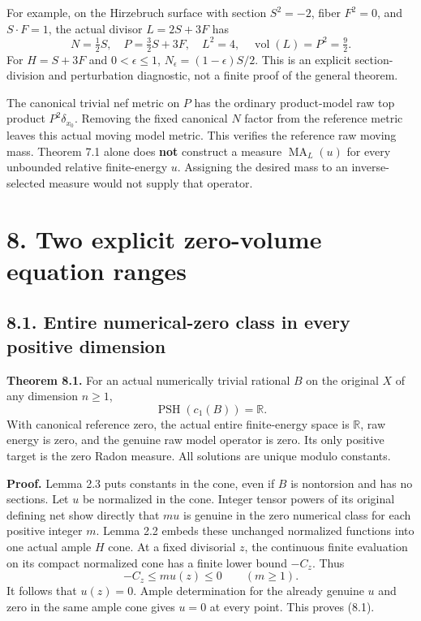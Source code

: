 \documentclass[
  10pt,
]{article}
\begin{document}
For example, on the Hirzebruch surface with section \(S^2=-2\), fiber
\(F^2=0\), and \(S\cdot F=1\), the actual divisor \(L=2S+3F\) has \[
 N=\tfrac12S,\quad P=\tfrac32S+3F,\quad L^2=4,
                     \quad\operatorname{vol}(L)=P^2=\tfrac92.
\] For \(H=S+3F\) and \(0<\epsilon\leq1\),
\(N_\epsilon=(1-\epsilon)S/2\). This is an explicit section-division and
perturbation diagnostic, not a finite proof of the general theorem.

The canonical trivial nef metric on \(P\) has the ordinary product-model
raw top product \(P^2\delta_{x_0}\). Removing the fixed canonical \(N\)
factor from the reference metric leaves this actual moving model metric.
This verifies the reference raw moving mass. Theorem 7.1 alone does
\textbf{not} construct a measure \(\operatorname{MA}_L(u)\) for every
unbounded relative finite-energy \(u\). Assigning the desired mass to an
inverse-selected measure would not supply that operator.

\section{8. Two explicit zero-volume equation
ranges}\label{two-explicit-zero-volume-equation-ranges}

\subsection{8.1. Entire numerical-zero class in every positive
dimension}\label{entire-numerical-zero-class-in-every-positive-dimension}

\textbf{Theorem 8.1.} For an actual numerically trivial rational \(B\)
on the original \(X\) of any dimension \(n\geq1\), \[
 \operatorname{PSH}(c_1(B))=\mathbb R.
                                                               \tag{8.1}
\] With canonical reference zero, the actual entire finite-energy space
is \(\mathbb R\), raw energy is zero, and the genuine raw model operator
is zero. Its only positive target is the zero Radon measure. All
solutions are unique modulo constants.

\textbf{Proof.} Lemma 2.3 puts constants in the cone, even if \(B\) is
nontorsion and has no sections. Let \(u\) be normalized in the cone.
Integer tensor powers of its original defining net show directly that
\(mu\) is genuine in the zero numerical class for each positive integer
\(m\). Lemma 2.2 embeds these unchanged normalized functions into one
actual ample \(H\) cone. At a fixed divisorial \(z\), the continuous
finite evaluation on its compact normalized cone has a finite lower
bound \(-C_z\). Thus \[
 -C_z\leq m u(z)\leq0 \qquad(m\geq1).
\] It follows that \(u(z)=0\). Ample determination for the already
genuine \(u\) and zero in the same ample cone gives \(u=0\) at every
point. This proves (8.1).
\end{document}
